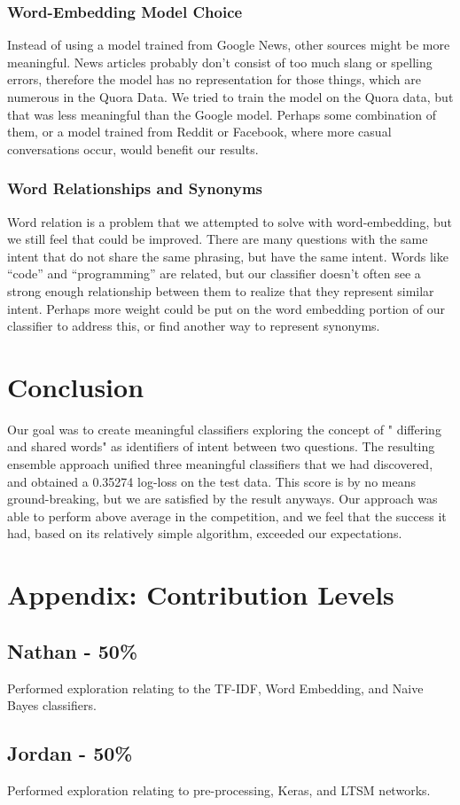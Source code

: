 \documentclass{article}
\begin{document}
\subsubsection{Word-Embedding Model Choice}

Instead of using a model trained from Google News, other sources might be more
meaningful. News articles probably don’t consist of too much slang or spelling
errors, therefore the model has no representation for those things, which are
numerous in the Quora Data. We tried to train the model on the Quora data, but
that was less meaningful than the Google model. Perhaps some combination of
them, or a model trained from Reddit or Facebook, where more casual
conversations occur, would benefit our results.

\subsubsection{Word Relationships and Synonyms}

Word relation is a problem that we attempted to solve with word-embedding, but
we still feel that could be improved. There are many questions with the same
intent that do not share the same phrasing, but have the same intent. Words like
“code” and “programming” are related, but our classifier doesn’t often see a
strong enough relationship between them to realize that they represent similar
intent. Perhaps more weight could be put on the word embedding portion of our
classifier to address this, or find another way to represent synonyms.

\section{Conclusion} \label{headings} Our goal was to create meaningful
classifiers exploring the concept of " differing and shared words" as
identifiers of intent between two questions. The resulting ensemble approach
unified three meaningful classifiers that we had discovered, and obtained a
0.35274 log-loss on the test data. This score is by no means ground-breaking,
but we are satisfied by the result anyways. Our approach was able to perform
above average in the competition, and we feel that the success it had, based on
its relatively simple algorithm, exceeded our expectations.

\section*{Appendix: Contribution Levels}

\subsection*{Nathan - 50\%}
Performed exploration relating to the TF-IDF, Word Embedding, and Naive Bayes classifiers.

\subsection*{Jordan - 50\%}
Performed exploration relating to pre-processing, Keras, and LTSM networks.
\end{document}
